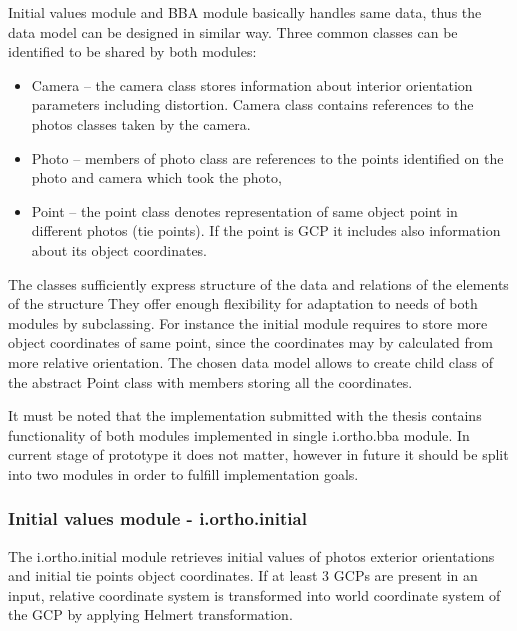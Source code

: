 \documentclass[a4paper,12pt]{article}
\begin{document}
Initial values module and BBA module basically handles  same data, thus 
the data model can be designed in similar way. 
Three common classes can be identified to be shared by both modules:
\begin{itemize}
\item Camera -- the camera class stores information about interior orientation 
parameters including distortion. Camera class contains references to the photos
classes taken by the camera.
\item Photo -- members of photo class are references to the points identified 
	    on the photo and camera which took the photo,
\item Point -- the point class denotes representation of same object point in different photos (tie points).
 If the point is GCP it includes also information about its object coordinates. 
\end{itemize}

The classes sufficiently express  structure of the data and relations of the elements of the structure
They offer enough flexibility for adaptation to needs of both modules by subclassing. 
For instance the initial module requires to store more object coordinates of same point, 
since the coordinates may by calculated from more relative orientation. The chosen data model allows 
to create child class of the abstract Point class with members storing all the coordinates. 

It must be noted that the implementation submitted with the thesis contains functionality of both modules
implemented in single i.ortho.bba module. 
In current stage of prototype it does not matter, however in future it should be split into two modules 
in order to fulfill implementation goals.  

\subsubsection{Initial values module - i.ortho.initial}


The i.ortho.initial module retrieves initial values of photos exterior orientations and initial tie points object coordinates. If at least 3 GCPs are 
present in an input, relative coordinate system is transformed into world coordinate system of the GCP by applying Helmert transformation. 

\end{document}
